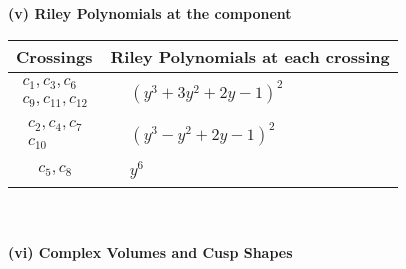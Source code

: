 \documentclass[1p]{elsarticle_modified}
\theoremstyle{definition}
\begin{document}
\newpage\renewcommand{\arraystretch}{1}
\flushleft \textbf{(v) Riley Polynomials at the component}\newline \\
\begin{tabular}{m{50pt}|m{274pt}}
Crossings & \hspace{64pt}Riley Polynomials at each crossing \\
\hline $$\begin{aligned}c_{1},c_{3},c_{6}\\c_{9},c_{11},c_{12}\end{aligned}$$&$\begin{aligned}
&(y^3+3 y^2+2 y-1)^2
\end{aligned}$\\
\hline $$\begin{aligned}c_{2},c_{4},c_{7}\\c_{10}\end{aligned}$$&$\begin{aligned}
&(y^3- y^2+2 y-1)^2
\end{aligned}$\\
\hline $$\begin{aligned}c_{5},c_{8}\end{aligned}$$&$\begin{aligned}
&y^6
\end{aligned}$\\
\hline
\end{tabular}\\~\\
\newpage\flushleft \textbf{(vi) Complex Volumes and Cusp Shapes}
\end{document}
